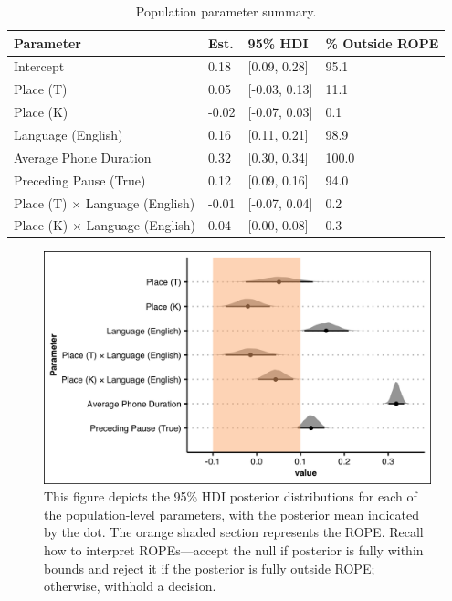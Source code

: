 \begin{table}[htbp]
  \caption{Population parameter summary.}
    \label{ch4:tab:poppar}
    \centering 
    \footnotesize
    \begin{tabular}{llll}
    \toprule
    \textbf{Parameter}         & \textbf{Est.} &  \textbf{95\% HDI} & \textbf{\% Outside ROPE} \\
    \midrule
    Intercept                             &  0.18   & [0.09, 0.28]  & 95.1 \\
    Place (T)                             &  0.05   & [-0.03, 0.13] & 11.1 \\
    Place (K)                             & -0.02   & [-0.07, 0.03] & 0.1  \\
    Language (English)                    &  0.16   & [0.11, 0.21]  & 98.9 \\
    Average Phone Duration                &  0.32   & [0.30, 0.34]  & 100.0 \\
    Preceding Pause (True)                &  0.12   & [0.09, 0.16]  & 94.0 \\
    Place (T) $\times$ Language (English) & -0.01   & [-0.07, 0.04] & 0.2 \\
    Place (K) $\times$ Language (English) &  0.04   & [0.00, 0.08]  & 0.3 \\
    \bottomrule
    \end{tabular}
\end{table}

\begin{figure}[htbp]
  \begin{center}
  \includegraphics[width=\linewidth]{figures/ch4_poppar_5in.png} 
  \caption{This figure depicts the 95\% HDI posterior distributions for each of the population-level parameters, with the posterior mean indicated by the dot. The orange shaded section represents the ROPE. Recall how to interpret ROPEs---accept the null if posterior is fully within bounds and reject it if the posterior is fully outside ROPE; otherwise, withhold a decision.}
  \label{ch4:fig:poppar}
  \end{center}
\end{figure} 

